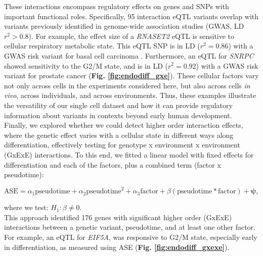 These interactions encompass regulatory effects on genes and SNPs with important functional roles. Specifically, 95 interaction eQTL variants overlap with variants previously identified in genome-wide association studies (GWAS, LD $r^2>0.8$). 
For example, the effect size of a \textit{RNASET2} eQTL is sensitive to cellular respiratory metabolic state. 
This eQTL SNP is in LD ($r^2=0.86$) with a GWAS risk variant for basal cell carcinoma \cite{chahal2016genome}. Furthermore, an eQTL for \textit{SNRPC} showed sensitivity to the G2/M state, and is in LD ($r^2=0.92$) with a GWAS risk variant for prostate cancer \cite{schumacher2018association} (\textbf{Fig. \ref{fig:endodiff_gxe}}). 
These cellular factors vary not only across cells in the experiments considered here, but also across cells \textit{in vivo}, across individuals, and across environments. 
Thus, these examples illustrate the versatility of our single cell dataset and how it can provide regulatory information about variants in contexts beyond early human development.\\

Finally, we explored whether we could detect higher order interaction effects, where the genetic effect varies with a cellular state in different ways along differentiation, effectively testing for genotype x environment x environment (GxExE) interactions. 
To this end, we fitted a linear model with fixed effects for differentiation and each of the factors, plus a combined term (factor x pseudotime):

\begin{equation}\label{eq:endodiff_ase_gxexe}
    \mathrm{ASE} = \alpha_1 \mathrm{pseudotime} + \alpha_2 \mathrm{pseudotime}^2 + \alpha_3\mathrm{factor} + \beta (\mathrm{pseudotime}*\mathrm{factor}) + \boldsymbol{\psi},
\end{equation}

where we test: $H_1: \beta \neq 0$. \\

This approach identified 176 genes with significant higher order (GxExE) interactions between a genetic variant, pseudotime, and at least one other factor. 
For example, an eQTL for \textit{EIF5A}, was responsive to G2/M state, especially early in differentiation, as measured using ASE (\textbf{Fig. \ref{fig:endodiff_gxexe}}). 

